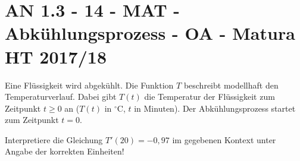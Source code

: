 \section{AN 1.3 - 14 - MAT - Abkühlungsprozess - OA - Matura HT 2017/18}

\begin{beispiel}[AN 1.3]{1} %
Eine Flüssigkeit wird abgekühlt. Die Funktion $T$ beschreibt modellhaft den Temperaturverlauf. Dabei gibt $T(t)$ die Temperatur der Flüssigkeit zum Zeitpunkt $t\geq 0$ an ($T(t)$ in $^\circ$C, $t$ in Minuten). Der Abkühlungsprozess startet zum Zeitpunkt $t=0$.

Interpretiere die Gleichung $T'(20)=-0,97$ im gegebenen Kontext unter Angabe der korrekten Einheiten!

\end{beispiel}